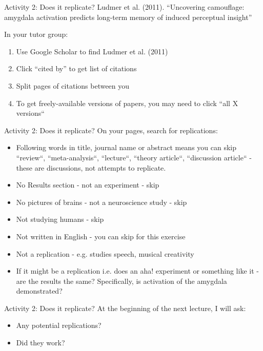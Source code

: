 \documentclass{beamer}
\begin{document}
\begin{frame}{Activity 2: Does it replicate?}
  Ludmer et al. (2011). ``Uncovering camouflage: amygdala activation predicts
  long-term memory of induced perceptual insight''

  In your tutor group: 
  \begin{enumerate}
    \item Use Google Scholar to find Ludmer et al. (2011)
    \item Click ``cited by'' to get list of citations
    \item Split pages of citations between you
    \item To get freely-available versions of papers, you may need to click ``all X versions``
    \end{enumerate}

\end{frame}

\begin{frame}{Activity 2: Does it replicate?} 
  On your pages, search for replications:
  \begin{itemize}
  \item Following words in title, journal name or abstract means you can skip ``review``, ``meta-analysis``, ``lecture``, ``theory article``, ``discussion article`` - these are discussions, not attempts to replicate.
  \item No Results section - not an experiment - skip
  \item No pictures of brains - not a neuroscience study - skip
  \item Not studying humans - skip
  \item Not written in English - you can skip for this exercise
  \item Not a replication - e.g. studies speech, musical creativity
  \item If it might be a replication i.e. does an aha! experiment or something like it - are the results the same? Specifically, is activation of the amygdala demonstrated?
  \end{itemize}
\end{frame}

\begin{frame}{Activity 2: Does it replicate?}
  At the beginning of the next lecture, I will ask:
  \begin{itemize}
  \item Any potential replications?
  \item Did they work?
  \end{itemize}
\end{frame}
\end{document}
